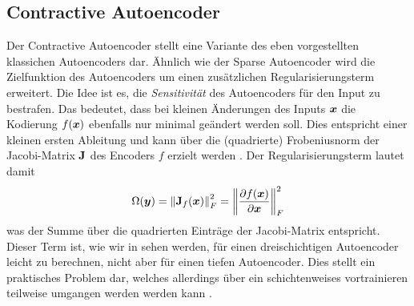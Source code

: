 \subsection{Contractive Autoencoder}
\label{ch:MethodenDerDimRed:ML:CAE}

Der Contractive Autoencoder \parencite{Rifai.2011} stellt eine Variante des eben vorgestellten klassichen Autoencoders
 dar. Ähnlich wie der Sparse Autoencoder wird die
Zielfunktion des Autoencoders um einen zusätzlichen Regularisierungsterm erweitert. Die Idee ist
es, die \textit{Sensitivität} des Autoencoders für den Input zu bestrafen. Das bedeutet, dass bei
kleinen Änderungen des Inputs $\bm{x}$ die Kodierung $f(\bm{x})$ ebenfalls nur minimal geändert
werden soll. Dies entspricht einer kleinen ersten Ableitung und kann über die (quadrierte)
Frobeniusnorm der Jacobi-Matrix $\mathbf{J}$ des Encoders $f$ erzielt werden \parencites[2]{Rifai.2011}[521]{Goodfellow.2016}. Der Regularisierungsterm lautet damit
\begin{equation}
	\label{eq:CAE-Regularisierung}
	\Omega(\bm{y}) = \left\lVert\mathbf{J}_f(\bm{x})\right\rVert_F^2 =  \left\lVert \frac{\partial f(\bm{x})}{\partial \bm{x}} \right\rVert^2_F
\end{equation}
was der Summe über die quadrierten Einträge der Jacobi-Matrix entspricht. Dieser Term ist, wie wir in  sehen werden, für einen dreischichtigen Autoencoder leicht zu berechnen, nicht aber für einen tiefen Autoencoder. Dies stellt ein praktisches Problem dar, welches allerdings über ein schichtenweises vortrainieren teilweise umgangen werden werden kann \parencite[vgl.][522]{Goodfellow.2016}.

